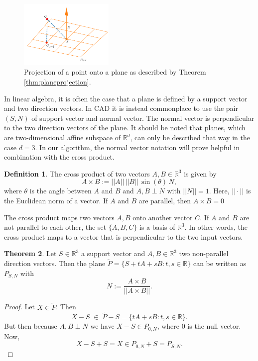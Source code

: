 \documentclass[a4paper, 11pt]{report}
\theoremstyle{definition}
\newtheorem{definition}{Definition}[section]
\newtheorem{theorem}[definition]{Theorem}
\begin{document}
	\begin{figure}[H]
		\centering
		\includegraphics[width=0.4\textwidth]{../python/surfacePlaneIntersection3_cropped.png}
		\caption{Projection of a point onto a plane as described by Theorem \ref{thm:planeprojection}.}
	\end{figure}

	In linear algebra, it is often the case that a plane is defined by a support vector and two direction vectors. In CAD it is instead commonplace to use the pair $(S,N)$ of support vector and normal vector. The normal vector is perpendicular to the two direction vectors of the plane. It should be noted that planes, which are two-dimensional affine subspace of $\mathbb{R}^d$, can only be described that way in the case $d = 3$. In our algorithm, the normal vector notation will prove helpful in combination with the cross product.

	\begin{definition}
		The cross product of two vectors $A, B \in \mathbb{R}^3$ is given by
			$$ A \times B := ||A|| \, ||B|| \, \sin(\theta) \, N,$$
		where $\theta$ is the angle between $A$ and $B$ and $A, B \perp N$ with $||N|| = 1$. Here, $||\cdot||$ is the Euclidean norm of a vector. If $A$ and $B$ are parallel, then $A \times B = 0$
	\end{definition}

	The cross product maps two vectors $A, B$ onto another vector $C$. If $A$ and $B$ are not parallel to each other, the set $\{A,B,C\}$ is a basis of $\mathbb{R}^3$. In other words, the cross product maps to a vector that is perpendicular to the two input vectors.

	\begin{theorem}\label{thm:planeequivalence}
		Let $S \in \mathbb{R}^3$ a support vector and $A, B \in \mathbb{R}^3$ two non-parallel direction vectors. Then the plane $\tilde P = \{S + tA + sB : t, s \in \mathbb{R}\}$ can be written as $P_{S,N}$ with 
			$$ N := \frac{A \times B}{||A \times B||}. $$
	\end{theorem}
	\begin{proof}
		Let $X \in \tilde P$. Then
			$$X - S \; \in \; \tilde P - S = \{tA+sB : t,s \in \mathbb{R}\}.$$
		But then because $A, B \perp N$ we have $X-S \in P_{0,N}$, where $0$ is the null vector. Now, 
			$$ X-S+S = X \in P_{0,N} + S = P_{S,N}.$$
	\end{proof}
\end{document}
